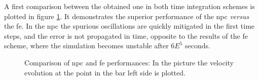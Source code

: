 \documentclass[preprint,12pt,a4paper]{elsarticle}
\begin{document}
A first comparison between the obtained one in both time integration
schemes is plotted in figure \ref{fig:Dyka-NPC-FE}. It demonstrates the
superior performance of the \acrshort{npc} \textit{versus} the \acrshort{fe}. In the \acrshort{npc} the
spurious oscillations are quickly mitigated in the first time steps,
and the error is not propagated in time, opposite to the results of the \acrshort{fe} scheme, where the
simulation becomes unstable after $6E^{5}$ seconds.
\begin{figure}
  \centering
  \caption{Comparison of \acrshort{npc} and \acrshort{fe}
      performances: In the picture the velocity evolution at the point in the bar left side
    is plotted.}
  \label{fig:Dyka-NPC-FE}
\end{figure}
\end{document}
